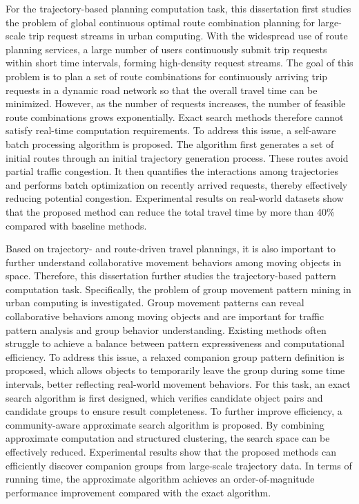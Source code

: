 For the trajectory-based planning computation task, this dissertation first studies the problem of global continuous optimal route combination planning for large-scale trip request streams in urban computing. With the widespread use of route planning services, a large number of users continuously submit trip requests within short time intervals, forming high-density request streams. The goal of this problem is to plan a set of route combinations for continuously arriving trip requests in a dynamic road network so that the overall travel time can be minimized. However, as the number of requests increases, the number of feasible route combinations grows exponentially. Exact search methods therefore cannot satisfy real-time computation requirements. To address this issue, a self-aware batch processing algorithm is proposed. The algorithm first generates a set of initial routes through an initial trajectory generation process. These routes avoid partial traffic congestion. It then quantifies the interactions among trajectories and performs batch optimization on recently arrived requests, thereby effectively reducing potential congestion. Experimental results on real-world datasets show that the proposed method can reduce the total travel time by more than 40\% compared with baseline methods.

Based on trajectory- and route-driven travel plannings, it is also important to further understand collaborative movement behaviors among moving objects in space. Therefore, this dissertation further studies the trajectory-based pattern computation task. Specifically, the problem of group movement pattern mining in urban computing is investigated. Group movement patterns can reveal collaborative behaviors among moving objects and are important for traffic pattern analysis and group behavior understanding. Existing methods often struggle to achieve a balance between pattern expressiveness and computational efficiency. To address this issue, a relaxed companion group pattern definition is proposed, which allows objects to temporarily leave the group during some time intervals, better reflecting real-world movement behaviors. For this task, an exact search algorithm is first designed, which verifies candidate object pairs and candidate groups to ensure result completeness. To further improve efficiency, a community-aware approximate search algorithm is proposed. By combining approximate computation and structured clustering, the search space can be effectively reduced. Experimental results show that the proposed methods can efficiently discover companion groups from large-scale trajectory data. In terms of running time, the approximate algorithm achieves an order-of-magnitude performance improvement compared with the exact algorithm.

